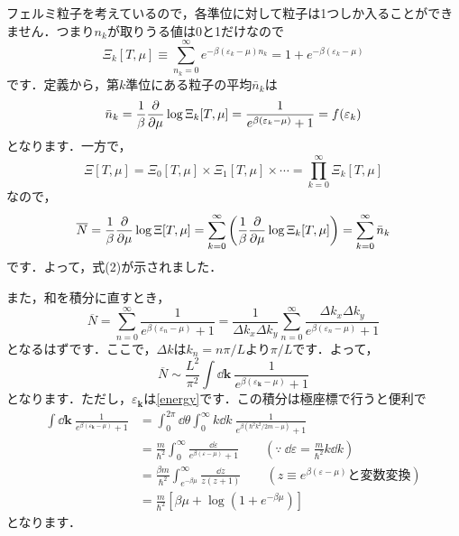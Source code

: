 \documentclass[a4paper,pdflatex,ja=standard]{bxjsarticle}
\begin{document}
\begin{enumerate}
  フェルミ粒子を考えているので，各準位に対して粒子は1つしか入ることができません．つまり$n_k$が取りうる値は0と1だけなので  
  \begin{equation}    
    \Xi_k[T,\mu]
    \equiv
    \sum_{n_k=0}^{\infty}
    e^{-\beta(\varepsilon_k-\mu)n_k}
    =
    1
    +
    e^{-\beta(\varepsilon_k-\mu)}
  \end{equation}
  です．定義から，第$k$準位にある粒子の平均$\bar{n}_k$は
  \begin{equation}
    \bar{n}_k
    =
    \frac{1}{\beta}\pdv{}{\mu}\log\Xi_k[T,\mu]
    =
    \frac{1}{e^{\beta(\varepsilon_k-\mu)}+1}
    =
    f(\varepsilon_k)
  \end{equation}
  となります．一方で，
  \begin{equation}
    \Xi[T,\mu]
    =
    \Xi_0[T,\mu]
    \times
    \Xi_1[T,\mu]
    \times
    \cdots
    =
    \prod_{k=0}^{\infty}
    \Xi_k[T,\mu]
  \end{equation}
  なので，
  \begin{equation}
    \overline{N}
    =
    \frac{1}{\beta}\pdv{}{\mu}\log\Xi[T,\mu]
    =
    \sum_{k=0}^{\infty}
    \left(  
      \frac{1}{\beta}\pdv{}{\mu}\log\Xi_k[T,\mu]
    \right)
    =
    \sum_{k=0}^{\infty}
    \bar{n}_k
  \end{equation}
  です．よって，式(2)が示されました．

  また，和を積分に直すとき，
  \begin{equation}
    \overline{N}
    =
    \sum_{n=0}^{\infty}
    \frac{1}{e^{\beta(\varepsilon_n-\mu)}+1}
    =
    \frac{1}{\Delta k_x\Delta k_y}
    \sum_{n=0}^{\infty}
    \frac{\Delta k_x\Delta k_y}{e^{\beta(\varepsilon_n-\mu)}+1}
  \end{equation}
  となるはずです．ここで，$\Delta k$は$k_n=n\pi/L$より$\pi/L$です．よって，
  \begin{equation}
    \overline{N}
    \sim
    \frac{L^2}{\pi^2}
    \int\dd \bm{k}\     
    \frac{1}{e^{\beta(\varepsilon_{\bm{k}}-\mu)}+1}
    \label{ave_num_part}
  \end{equation}
  となります．ただし，$\varepsilon_{\bm{k}}$は\eqref{energy}です．この積分は極座標で行うと便利で
  \begin{align}
    \int\dd \bm{k}\     
    \frac{1}{e^{\beta(\varepsilon_{\bm{k}}-\mu)}+1}
    &=
    \int_{0}^{2\pi}\dd \theta\int_{0}^{\infty}k\dd k\     
    \frac{1}{e^{\beta(\hbar^2 k^2/2m-\mu)}+1}
    \nonumber
    \\
    &=
    \frac{m}{\hbar^2}
    \int_{0}^{\infty}
    \frac{\dd \varepsilon}{e^{\beta(\varepsilon-\mu)}+1}
    \qquad
    \left(  
      \because
      \ 
      \dd \varepsilon
      =
      \frac{m}{\hbar^2}
      k\dd k
    \right)
    \nonumber
    \\
    &=
    \frac{\beta m}{\hbar^2}
    \int_{e^{-\beta\mu}}^{\infty}
    \frac{\dd z}{z(z+1)}
    \qquad
    \left(  
      z\equiv e^{\beta(\varepsilon-\mu)}
      \text{と変数変換}
    \right)
    \nonumber
    \\  
    &=
    \frac{m}{\hbar^2}
    \left[  
      \beta\mu
      +
      \log(1+e^{-\beta\mu})
    \right]
  \end{align}
  となります．



\end{enumerate}
\end{document}
